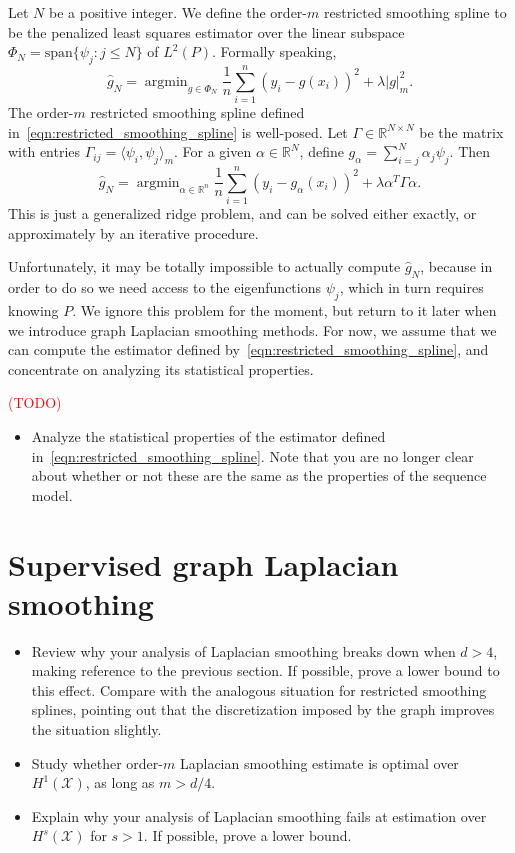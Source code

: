 \documentclass{article}
\newcommand{\Reals}{\mathbb{R}}
\newcommand{\1}{\mathbf{1}}
\DeclareMathOperator*{\argmin}{argmin}
\newcommand{\mc}[1]{\mathcal{#1}}
\newcommand{\dotp}[2]{\langle #1, #2 \rangle}
\newcommand{\wh}[1]{\widehat{#1}}
\theoremstyle{alden}
\theoremstyle{aldenthm}
\theoremstyle{definition}
\theoremstyle{remark}
\begin{document}
Let $N$ be a positive integer. We define the order-$m$ restricted smoothing spline to be the penalized least squares estimator over the linear subspace  $\Phi_N = \mathrm{span}\{\psi_j: j \leq N\}$ of $L^2(P)$. Formally speaking,
\begin{equation}
\label{eqn:restricted_smoothing_spline}
\wh{g}_{N} = \argmin_{g \in \Phi_N} \frac{1}{n} \sum_{i = 1}^{n} (y_i - g(x_i))^2 + \lambda |g|_{m}^2.
\end{equation}
The order-$m$ restricted smoothing spline defined in~\eqref{eqn:restricted_smoothing_spline} is well-posed. Let $\Gamma \in \Reals^{N \times N}$ be the matrix with entries $\Gamma_{ij} = \dotp{\psi_i}{\psi_j}_{m}$. For a given $\alpha \in \Reals^N$, define $g_{\alpha} = \sum_{i = j}^{N} \alpha_j \psi_j$. Then
\begin{equation*}
\wh{g}_{N} = \argmin_{\alpha \in \Reals^n} \frac{1}{n} \sum_{i = 1}^{n} (y_i - g_{\alpha}(x_i))^2 + \lambda \alpha^T \Gamma \alpha.
\end{equation*}
This is just a generalized ridge problem, and can be solved either exactly, or approximately by an iterative procedure.

Unfortunately, it may be totally impossible to actually compute $\wh{g}_N$, because in order to do so we need access to the eigenfunctions $\psi_j$, which in turn requires knowing $P$. We ignore this problem for the moment, but return to it later when we introduce graph Laplacian smoothing methods. For now, we assume that we can compute the estimator defined by~\eqref{eqn:restricted_smoothing_spline}, and concentrate on analyzing its statistical properties. 

\textcolor{red}{(TODO)}
\begin{itemize}
	\item Analyze the statistical properties of the estimator defined in~\eqref{eqn:restricted_smoothing_spline}. Note that you are no longer clear about whether or not these are the same as the properties of the sequence model.
\end{itemize}

\section{Supervised graph Laplacian smoothing}

\begin{itemize}
	\item Review why your analysis of Laplacian smoothing breaks down when $d > 4$, making reference to the previous section. If possible, prove a lower bound to this effect. Compare with the analogous situation for restricted smoothing splines, pointing out that the discretization imposed by the graph improves the situation slightly.
	\item Study whether order-$m$ Laplacian smoothing estimate is optimal over $H^1(\mc{X})$, as long as $m > d/4$. 
	\item Explain why your analysis of Laplacian smoothing fails at estimation over $H^s(\mc{X})$ for $s > 1$. If possible, prove a lower bound.
\end{itemize}
\end{document}
